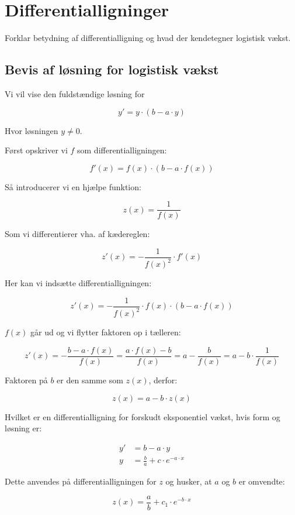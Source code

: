 
\section{Differentialligninger}

Forklar betydning af differentialligning og hvad der kendetegner logistisk vækst.

\subsection{Bevis af løsning for logistisk vækst}

\begin{proofw}
    
Vi vil vise den fuldstændige løsning for

$$
    y'=y \cdot (b-a\cdot y)
$$

Hvor løsningen $y \neq 0$.

Først opskriver vi $f$ som differentialligningen:

$$
    f'(x)=f(x) \cdot (b-a \cdot f(x))
$$

Så introducerer vi en hjælpe funktion:

$$
    z(x)=\frac{1}{f(x)}
$$

Som vi differentierer vha. af kædereglen:

$$
    z'(x)=-\frac{1}{f(x)^2} \cdot f'(x)
$$

Her kan vi indsætte differentialligningen:

$$
    z'(x)=-\frac{1}{f(x)^2} \cdot f(x) \cdot (b-a \cdot f(x))
$$

$f(x)$ går ud og vi flytter faktoren op i tælleren:

$$
    z'(x)=-\frac{b-a \cdot f(x)}{f(x)}=\frac{a \cdot f(x)-b}{f(x)}=a-\frac{b}{f(x)}
    =a-b\cdot \frac{1}{f(x)}
$$

Faktoren på $b$ er den samme som $z(x)$, derfor:

$$
    z(x)=a-b\cdot z(x)
$$

Hvilket er en differentialligning for forskudt eksponentiel vækst,
hvis form og løsning er:

\begin{align*}
    y'&=b-a\cdot y
    \\
    y&=\frac{b}{a}+c \cdot e^{-a\cdot x}
\end{align*}

Dette anvendes på differentialligningen for $z$ og husker, at $a$ og $b$ er omvendte:

$$
    z(x)=\frac{a}{b}+c_1 \cdot e^{-b\cdot x}
$$


\end{proofw}
